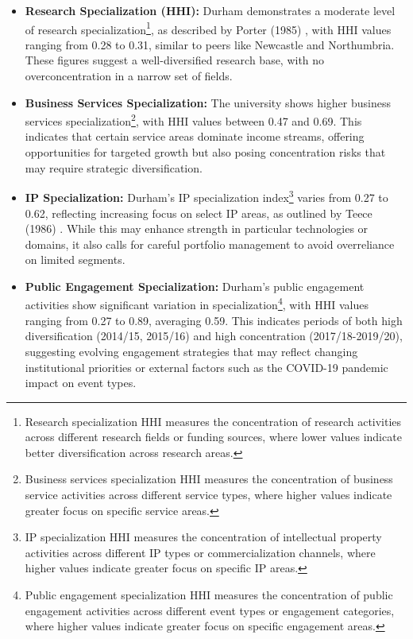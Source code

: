 \documentclass[journal,onecolumn, 10pt,draftclsnofoot]{IEEEtran}
\begin{document}
\begin{itemize}
    \item \textbf{Research Specialization (HHI):} Durham demonstrates a moderate level of research specialization\footnote{Research specialization HHI measures the concentration of research activities across different research fields or funding sources, where lower values indicate better diversification across research areas.}, as described by Porter (1985) \cite{porter1985competitive}, with HHI values ranging from 0.28 to 0.31, similar to peers like Newcastle and Northumbria. These figures suggest a well-diversified research base, with no overconcentration in a narrow set of fields.

\item \textbf{Business Services Specialization:} The university shows higher business services specialization\footnote{Business services specialization HHI measures the concentration of business service activities across different service types, where higher values indicate greater focus on specific service areas.}, with HHI values between 0.47 and 0.69. This indicates that certain service areas dominate income streams, offering opportunities for targeted growth but also posing concentration risks that may require strategic diversification.

\item \textbf{IP Specialization:} Durham's IP specialization index\footnote{IP specialization HHI measures the concentration of intellectual property activities across different IP types or commercialization channels, where higher values indicate greater focus on specific IP areas.} varies from 0.27 to 0.62, reflecting increasing focus on select IP areas, as outlined by Teece (1986) \cite{teece1986profiting}. While this may enhance strength in particular technologies or domains, it also calls for careful portfolio management to avoid overreliance on limited segments.

\item \textbf{Public Engagement Specialization:} Durham's public engagement activities show significant variation in specialization\footnote{Public engagement specialization HHI measures the concentration of public engagement activities across different event types or engagement categories, where higher values indicate greater focus on specific engagement areas.}, with HHI values ranging from 0.27 to 0.89, averaging 0.59. This indicates periods of both high diversification (2014/15, 2015/16) and high concentration (2017/18-2019/20), suggesting evolving engagement strategies that may reflect changing institutional priorities or external factors such as the COVID-19 pandemic impact on event types.
\end{itemize}
\end{document}

